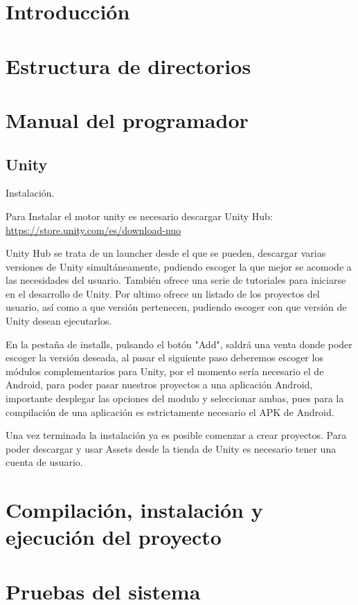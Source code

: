
\section{Introducción}

\section{Estructura de directorios}

\section{Manual del programador}
\subsection{Unity}
Instalación.

Para Instalar el motor unity es necesario descargar Unity Hub: \url{https://store.unity.com/es/download-nuo}

Unity Hub se trata de un launcher desde el que se pueden, descargar varias versiones de Unity simultáneamente, pudiendo escoger la que mejor se acomode a las necesidades del usuario. También ofrece una serie de tutoriales para iniciarse en el desarrollo de Unity. Por ultimo ofrece un listado de los proyectos del usuario, así como a que versión pertenecen, pudiendo escoger con que versión de Unity desean ejecutarlos.

En la pestaña de installs, pulsando el botón "Add", saldrá una venta donde poder escoger la versión deseada, al pasar el siguiente paso deberemos escoger los módulos complementarios para Unity, por el momento sería necesario el de Android, para poder pasar nuestros proyectos a una aplicación Android, importante desplegar las opciones del modulo y seleccionar ambas, pues para la compilación de una aplicación es estrictamente necesario el APK de Android.

Una vez terminada la instalación ya es posible comenzar a crear proyectos. 
Para poder descargar y usar Assets desde la tienda de Unity es necesario tener una cuenta de usuario.

\section{Compilación, instalación y ejecución del proyecto}

\section{Pruebas del sistema}
